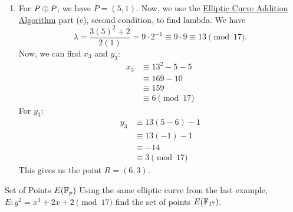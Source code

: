 {\begin{enumerate}[label=(\alph*)]
        \item For \(P \oplus P\), we have \(P = (5,1)\). Now, we use the \hyperref[thm:Elliptic Curve Addition Algorithm]{Elliptic Curve Addition Algorithm} part (e), second condition, to find lambda. We have
              \[
                  \lambda = \frac{3(5)^{2} + 2}{2(1)} = 9 \cdot 2^{-1} \equiv 9 \cdot 9 \equiv 13 \pmod{17}.
              \]
              Now, we can find \(x_{3}\) and \(y_{3}\):
              \begin{align*}
                  x_{3} & \equiv 13^{2} - 5 - 5 \\
                        & \equiv 169 - 10       \\
                        & \equiv 159            \\
                        & \equiv 6 \pmod{17}
              \end{align*}
              For \(y_{3}\):
              \begin{align*}
                  y_{3} & \equiv 13(5 - 6) - 1 \\
                        & \equiv 13(-1) - 1    \\
                        & \equiv -14           \\
                        & \equiv 3 \pmod{17}
              \end{align*}
              This gives us the point \(R = (6,3)\).
    \end{enumerate}
}

\begin{example}
    {Set of Points \(E(\mathbb{F}_{p})\)} Using the same elliptic curve from the last example, \(E \colon y^{2} = x^{3} + 2x + 2 \pmod{17}\) find the set of points \(E(\mathbb{F}_{17})\).
\end{example}

